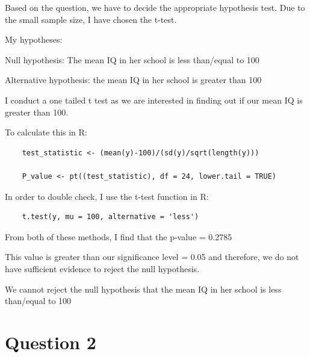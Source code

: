 \documentclass{article}
\begin{document}
Based on the question, we have to decide the appropriate hypothesis test.
Due to the small sample size, I have chosen the t-test. 
\vspace{0.3cm}

\noindent My hypotheses: 

Null hypothesis: The mean IQ in her school is less than/equal to 100


Alternative hypothesis: the mean IQ in her school is greater than 100

\vspace{0.3cm}
\noindent 
I conduct a one tailed t test as we are interested in finding out if our mean IQ is greater than 100. 

To calculate this in R:
\begin{verbatim}
    test_statistic <- (mean(y)-100)/(sd(y)/sqrt(length(y)))

    P_value <- pt((test_statistic), df = 24, lower.tail = TRUE)    
\end{verbatim}
In order to double check, I use the t-test function in R:
\begin{verbatim}
    t.test(y, mu = 100, alternative = 'less')
\end{verbatim}

From both of these methods, I find that the p-value = 0.2785

This value is greater than our significance level = 0.05 and therefore,
we do not have sufficient evidence to reject the null hypothesis.

We cannot reject the null hypothesis that the mean IQ in her school is less than/equal to 100

\pagebreak
\section{Question 2}
\end{document}

